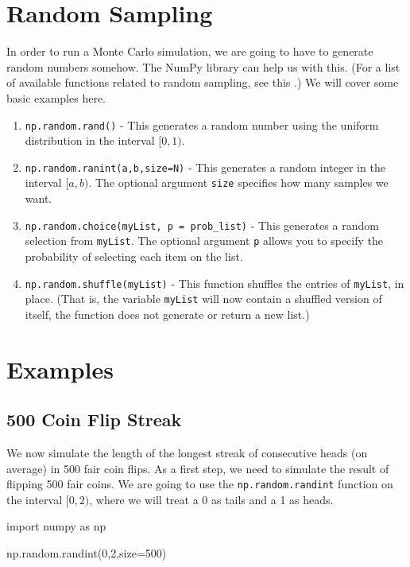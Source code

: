 \documentclass{ximera}
\begin{document}
\section{Random Sampling}

In order to run a Monte Carlo simulation, we are going to have to generate random numbers somehow. The NumPy library can help us with this. (For a list of available functions related to random sampling, see this .) We will cover some basic examples here.
\begin{enumerate}
	\item \verb|np.random.rand()| - This generates a random number using the uniform distribution in the interval $[0,1)$.
	\item \verb|np.random.ranint(a,b,size=N)| - This generates a random integer in the interval $[a,b)$. The optional argument \verb|size| specifies how many samples we want.
	\item \verb|np.random.choice(myList, p = prob_list)| - This generates a random selection from \verb|myList|. The optional argument \verb|p| allows you to specify the probability of selecting each item on the list.
	\item \verb|np.random.shuffle(myList)| - This function shuffles the entries of \verb|myList|, in place. (That is, the variable \verb|myList| will now contain a shuffled version of itself, the function does not generate or return a new list.)
\end{enumerate}

\section{Examples}

\subsection{500 Coin Flip Streak}

We now simulate the length of the longest streak of consecutive heads (on average) in 500 fair coin flips. As a first step, we need to simulate the result of flipping 500 fair coins. We are going to use the \verb|np.random.randint| function on the interval $[0,2)$, where we will treat a 0 as tails and a 1 as heads.

\begin{sageCell}
import numpy as np

np.random.randint(0,2,size=500)
\end{sageCell}
\end{document}
